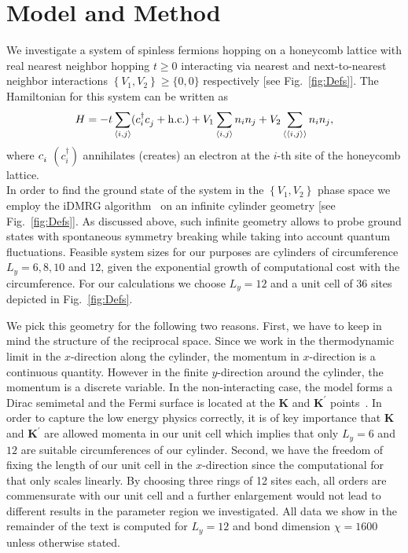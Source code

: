 \documentclass[aps,prx,10pt,twocolumn,floatfix,superscriptaddress,showpacs,numerical,footinbib]{revtex4-1}
\begin{document}
\section{\label{sec:modandmeth}Model and Method}
%
We investigate a system of spinless fermions hopping on a honeycomb lattice with real nearest neighbor hopping $t\ge0$ interacting via nearest and next-to-nearest neighbor interactions 
$\left\lbrace V_{1},V_{2}\right\rbrace \ge \lbrace 0,0 \rbrace  $ respectively [see Fig.~\ref{fig:Defs}]. 
%
The Hamiltonian for this system can be written as
\begin{equation}
%
 H=-t\sum_{\left\langle i,j\right\rangle}(c^{\dagger}_{i}c^{\vphantom{\dagger}}_{j}+ \mathrm{h.c.})+
V_{1}\sum_{\left\langle i,j\right\rangle }n_{i}n_{j}+
%
V_{2}\sum_{\left\langle \left\langle i,j\right\rangle \right\rangle }n_{i}n_{j},
%
\label{eq:H}
\end{equation}
%
where $c_{i}^{\vphantom{\dagger}}$ $(c^{\dagger}_{i})$  annihilates (creates) an electron at the $i$-th site of the honeycomb lattice.\\
%
In order to find the ground state of the system in the $\left\lbrace V_{1},V_{2}\right\rbrace$ phase space
we employ the iDMRG algorithm~\cite{M08,W92,KZM13} on an infinite cylinder geometry [see Fig.~\ref{fig:Defs}].
%
As discussed above, such infinite geometry allows to probe ground states with spontaneous 
symmetry breaking while taking into account quantum fluctuations.
%
Feasible system sizes for our purposes are cylinders of circumference $L_{y} = 6,8,10$ and $12$, 
given the exponential growth of computational cost with the circumference.
%
For our calculations we choose $L_y=12$ and a unit cell of 36 sites depicted in Fig.~\ref{fig:Defs}.
%

We pick this geometry for the following two reasons.
%
First, we have to keep in mind the structure of the reciprocal space.
%
Since we work in the thermodynamic limit in the $x$-direction along the cylinder, the momentum in $x$-direction is a continuous quantity.
%
However in the finite $y$-direction around the cylinder, the momentum is a discrete variable.
%
In the non-interacting case, the model forms a Dirac semimetal and the Fermi surface is located at the 
$\mathbf{K}$ and $\mathbf{K}^{\prime}$ points~\cite{CastroNeto2009}.
%
In order to capture the low energy physics correctly, it is of key importance that $\mathbf{K}$ and $\mathbf{K}^{\prime}$ are allowed momenta in our unit cell which implies that only $L_y=6$ and $12$ are suitable circumferences of our cylinder.
%
Second, we have the freedom of fixing the length of our unit cell in the $x$-direction since the computational for that only scales linearly.
%
By choosing three rings of 12 sites each, all orders are commensurate with our unit cell and a further enlargement would not lead to different results in the parameter region we investigated.
%
All data we show in the remainder of the text is computed for $L_y = 12$ and bond dimension $\chi = 1600$ unless otherwise stated.
\end{document}
